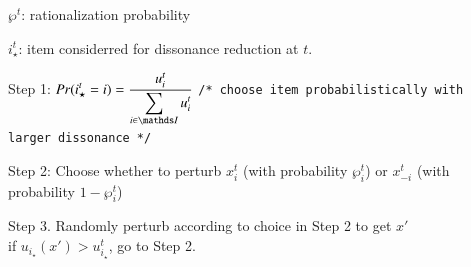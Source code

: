 \documentclass[onecolumn, compsoc,11pt]{IEEEtran}
\begin{document}
$\wp^t$: rationalization probability

$i_\star^t$: item considerred for dissonance reduction at $t$.


Step 1: \hspace{10pt} $\displaystyle Pr(i_\star^t = i) = \frac{u^t_i}{\displaystyle \sum_{i \in \I} u^t_i}$ \hfill\texttt{\scriptsize  /* choose item probabilistically with larger dissonance */ }

Step 2:  \hspace{10pt} Choose whether to perturb $x^t_i$ (with probability $\wp^t_i$) or $x_{-i}^t$ (with probability $1-\wp^t_i$)

Step 3. Randomly perturb according to choice in Step 2 to get $x'$ \\
        if $u_{i_\star}(x') > u^t_{i_\star}$, go to Step 2.
\end{document}
